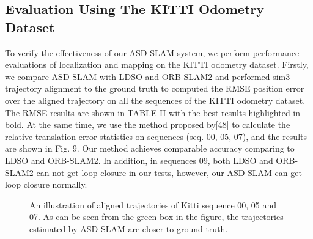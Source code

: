 \documentclass[letterpaper, 10 pt, conference]{ieeeconf}  %
\begin{document}
\subsection{Evaluation Using The KITTI Odometry Dataset}
To verify the effectiveness of our ASD-SLAM system, we perform performance evaluations of localization and mapping on the KITTI odometry dataset. Firstly, we compare ASD-SLAM with LDSO and ORB-SLAM2  and performed sim3 trajectory alignment to the ground truth to computed the RMSE position error over the aligned trajectory on all the sequences of the KITTI odometry dataset. The RMSE results are shown in TABLE II with the best results highlighted in bold. At the same time, we use the method proposed by[48] to calculate the relative translation error statistics on sequences (seq. 00, 05, 07), and the results are shown in Fig. 9. Our method achieves comparable accuracy comparing to LDSO and ORB-SLAM2. In addition,  in sequences 09, both LDSO and ORB-SLAM2 can not get loop closure in our tests, however, our ASD-SLAM can get loop closure normally.
\begin{figure}[H]
\flushleft 
{}%
%

%
%

\caption{An illustration of aligned trajectories of Kitti sequence 00, 05 and 07. As can be seen from the green box in the figure, the trajectories estimated by ASD-SLAM are closer to ground truth.} 
\end{figure}
\end{document}

